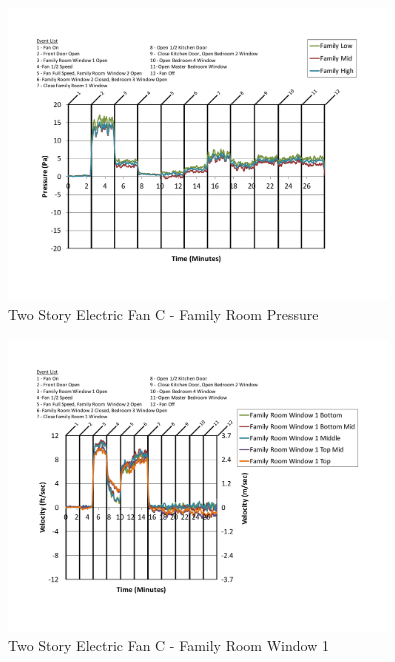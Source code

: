 \documentclass{article}
\begin{document}
\begin{appendices}
	\begin{figure}[H]
		\centering
		\includegraphics[height=3.05in,trim=0.67in 1.1in 0.67in 0.8in,clip=true]{0_Images/Results_Charts/ColdFlow/Two_Story/Electric/C/Family_Room_Pressure.pdf}
		\caption{Two Story Electric Fan C - Family Room Pressure}
	\end{figure}
 

	\begin{figure}[H]
		\centering
		\includegraphics[height=3.05in,trim=0.67in 1.1in 0.67in 0.8in,clip=true]{0_Images/Results_Charts/ColdFlow/Two_Story/Electric/C/Family_Room_Window_1.pdf}
		\caption{Two Story Electric Fan C - Family Room Window 1}
	\end{figure}
 
	\clearpage


\end{appendices}
\end{document}
